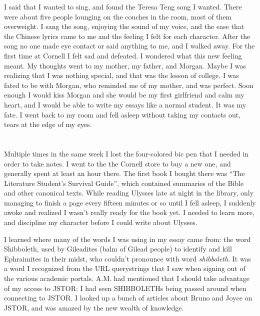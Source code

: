 I said that I wanted to sing, and found the Teresa Teng song I wanted.  There
were about five people lounging on the couches in the room, most of them
overweight.  I sang the song, enjoying the sound of my voice, and the ease that
the Chinese lyrics came to me and the feeling I felt for each character.  After
the song no one made eye contact or said anything to me, and I walked away.  For
the first time at Cornell I felt sad and defeated.  I wondered what this new
feeling meant.  My thoughts went to my mother, my father, and Morgan.  Maybe I
was realizing that I was nothing special, and that was the lesson of college.  I
was fated to be with Morgan, who reminded me of my mother, and was perfect.
Soon enough I would kiss Morgan and she would be my first girlfriend and calm my
heart, and I would be able to write my essays like a normal student.  It was my
fate.  I went back to my room and fell asleep without taking my contacts out,
tears at the edge of my eyes.

\section{}

Multiple times in the same week I lost the four-colored bic pen that I needed in
order to take notes.  I went to the the Cornell store to buy a new one, and
generally spent at least an hour there.  The first book I bought there was ``The
Literature Student's Survival Guide'', which contained summaries of the Bible
and other canonical texts.  While reading Ulysses late at night in the library,
only managing to finish a page every fifteen minutes or so until I fell asleep,
I suddenly awoke and realized I wasn't really ready for the book yet.  I needed
to learn more, and discipline my character before I could write about Ulysses.  

I learned where many of the words I was using in my essay came from: the word
Shibboleth, used by Gileadites (balm of Gilead people) to identify and kill
Ephraimites in their midst, who couldn't pronounce with word \textit{shibboleth}.
It was a word I recognized from the URL querystrings that I saw when signing out
of the various academic portals.  A.M. had mentioned that I should take
advantage of my access to JSTOR: I had seen SHIBBOLETHs being passed around when
connecting to JSTOR.  I looked up a bunch of articles about Bruno and Joyce on
JSTOR, and was amazed by the new wealth of knowledge.


